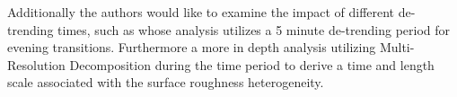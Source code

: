 \documentclass[]{article}
\begin{document}
 
 Additionally the authors would like to examine the impact of different de-trending times, such as \cite{} whose analysis utilizes a 5 minute de-trending period for evening transitions. Furthermore a more in depth analysis utilizing Multi-Resolution Decomposition during the time period  to derive a time and length scale associated with the surface roughness heterogeneity. 

\newpage


\end{document}
